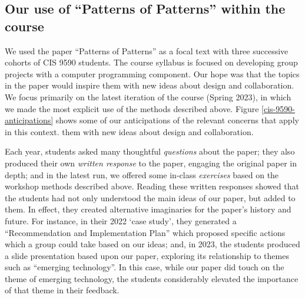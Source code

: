 \documentclass[acmlarge,timestamp]{acmart}
\begin{document}
\subsection{Our use of “Patterns of Patterns” within the course}
\label{pop1-in-cis9590}
We used the paper “Patterns of Patterns” as a focal text with three
successive cohorts of CIS 9590 students.  The course syllabus is
focused on developing group projects with a computer programming
component.  Our hope was that the topics in the paper would inspire
them with new ideas about design and collaboration.  We focus
primarily on the latest iteration of the course (Spring 2023), in
which we made the most explicit use of the methods described above.
Figure \ref{cis-9590-anticipations} shows some of our anticipations of
the relevant concerns that apply in this context.
them with new ideas about design and collaboration.

Each year, students asked many thoughtful \emph{questions} about the
paper; they also produced their own \emph{written response} to the
paper, engaging the original paper in depth; and in the latest run, we
offered some in-class \emph{exercises} based on the workshop methods
described above.  Reading these written responses showed that the
students had not only understood the main ideas of our paper, but
added to them.  In effect, they created alternative imaginaries for
the paper’s history and future.  For instance, in their 2022 ‘case
study’, they generated a “Recommendation and Implementation Plan”
which proposed specific actions which a group could take based on our
ideas; and, in 2023, the students produced a slide presentation based
upon our paper, exploring its relationship to themes such as “emerging
technology”.  In this case, while our paper did touch on the theme of
emerging technology, the students considerably elevated the importance
of that theme in their feedback.
\end{document}
